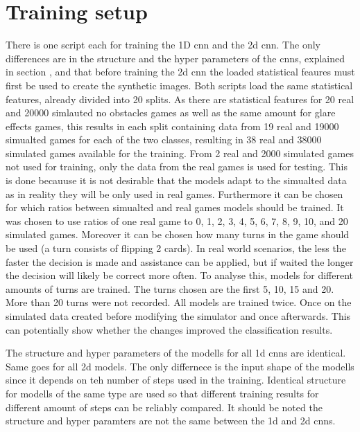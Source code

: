 \section{Training setup}
There is one script each for training the 1D cnn and the 2d cnn. The only differences are in the structure and the hyper parameters of the cnns, explained in section , and that before training the 2d cnn the loaded statistical feaures must first be used to create the synthetic images. Both scripts load the same statistical features, already divided into 20 splits. As there are statistical features for 20 real and 20000 simlauted no obstacles games as well as the same amount for glare effects games, this results in each split containing data from 19 real and 19000 simualted games for each of the two classes, resulting in 38 real and 38000 simulated games available for the training. From 2 real and 2000 simulated games not used for training, only the data from the real games is used for testing. This is done becauuse it is not desirable that the models adapt to the simualted data as in reality they will be only used in real games. Furthermore it can be chosen for which ratios between simualted and real games models should be trained. It was chosen to use ratios of one real game to 0, 1, 2, 3, 4, 5, 6, 7, 8, 9, 10, and 20 simulated games. Moreover it can be chosen how many turns in the game should be used (a turn consists of flipping 2 cards). In real world scenarios, the less the faster the decision is made and assistance can be applied, but if waited the longer the decision will likely be correct more often. To analyse this, models for different amounts of turns are trained. The turns chosen are the first 5, 10, 15 and 20. More than 20 turns were not recorded.  All models are trained twice. Once on the simulated data created before modifying the simulator and once afterwards. This can potentially show whether the changes improved the classification results. 

The structure and hyper parameters of the modells for all 1d cnns are identical. Same goes for all 2d models. The only differnece is the input shape of the modells since it depends on teh number of steps used in the training. Identical structure for modells of the same type are used so that different training results for different amount of steps can be reliably compared. It should be noted the structure and hyper paramters are not the same between the 1d and 2d cnns. 

